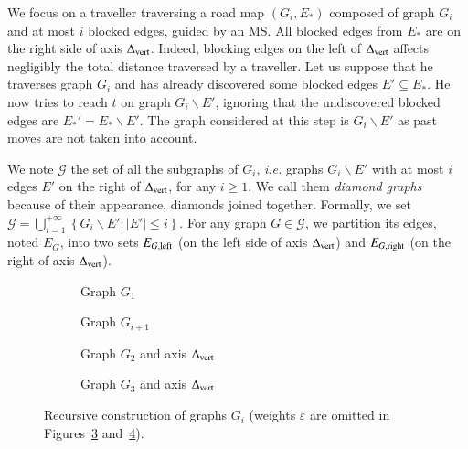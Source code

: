 \documentclass[preprint]{elsarticle}
\newcommand{\set}[1]{\left\{ #1 \right\}}
\newcommand{\card}[1]{\left| #1 \right|}
\newcommand{\mcalg}{\mathcal{G}}
\newcommand{\mcalr}{\mathcal{R}}
\newcommand{\mts}{MS}
\newcommand{\deltavert}{\Delta_{\mbox{\scriptsize{vert}}}}
\newcommand{\eleft}[1]{E_{#1, \mbox{\scriptsize{left}}}}
\newcommand{\eright}[1]{E_{#1, \mbox{\scriptsize{right}}}}
\begin{document}
We focus on a traveller traversing a road map $\left(G_i,E_*\right)$ composed of graph $G_i$ and at most $i$ blocked edges, guided by an \mts . All blocked edges from $E_*$ are on the right side of axis $\deltavert$. Indeed, blocking edges on the left of $\deltavert$ affects negligibly the total distance traversed by a traveller. Let us suppose that he traverses graph $G_i$ and has already discovered some blocked edges $E' \subseteq E_*$. He now tries to reach $t$ on graph $G_i\backslash E'$, ignoring that the undiscovered blocked edges are $E_*' = E_* \backslash E'$. The graph considered at this step is $G_i\backslash E'$ as past moves are not taken into account. 

We note $\mcalg$ the set of all the subgraphs of $G_i$, {\em i.e.} graphs $G_i\backslash E'$ with at most $i$ edges $E'$ on the right of $\deltavert$, for any $i \geq 1$. We call them \textit{diamond graphs} because of their appearance, diamonds joined together. Formally, we set $\mcalg = \bigcup_{i=1}^{+\infty} \set{G_i\backslash E' : \card{E'} \leq i}$. For any graph $G \in \mcalg$, we partition its edges, noted $E_G$, into two sets $\eleft{G}$ (on the left side of axis $\deltavert$) and $\eright{G}$ (on the right of axis $\deltavert$). 

\begin{figure}[h]
\centering
\begin{subfigure}[b]{0.49\columnwidth}
\centering
\scalebox{.52}{}
\caption{Graph $G_1$}
\label{subfig:G_1}
\end{subfigure}
\begin{subfigure}[b]{0.49\columnwidth}
\centering
\scalebox{.52}{}
\caption{Graph $G_{i+1}$}
\label{subfig:G_i}
\end{subfigure}
\begin{subfigure}[b]{0.49\columnwidth}
\centering
\scalebox{.45}{}
\caption{Graph $G_2$ and axis $\deltavert$}
\label{subfig:G_2}
\end{subfigure}
\begin{subfigure}[b]{0.49\columnwidth}
\centering
\scalebox{0.45}{}
\caption{Graph $G_3$ and axis $\deltavert$}
\label{subfig:G_3}
\end{subfigure}
\caption{Recursive construction of graphs $G_i$ 
(weights $\varepsilon$ are omitted in Figures~\ref{subfig:G_2} and~\ref{subfig:G_3}).
}
\label{fig:G_i}
\end{figure}
\end{document}
